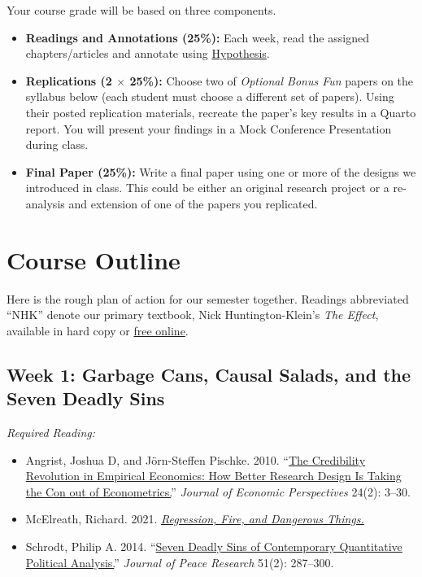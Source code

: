 \documentclass[11pt, letterpaper]{article}
\begin{document}
Your course grade will be based on three components.

\begin{itemize}
	\item \textbf{Readings and Annotations (25\%):} Each week, read the assigned chapters/articles and annotate using \href{https://hypothes.is/groups/Qm2VnAae/causal-inference}{Hypothesis}.
	\item \textbf{Replications (2 $\times$ 25\%):} Choose two of \textit{Optional Bonus Fun} papers on the syllabus below (each student must choose a different set of papers). Using their posted replication materials, recreate the paper's key results in a Quarto report. You will present your findings in a Mock Conference Presentation during class.
	\item \textbf{Final Paper (25\%):} Write a final paper using one or more of the designs we introduced in class. This could be either an original research project or a re-analysis and extension of one of the papers you replicated.
\end{itemize}


\section*{Course Outline}

Here is the rough plan of action for our semester together. Readings abbreviated ``NHK'' denote our primary textbook, Nick Huntington-Klein's \textit{The Effect}, available in hard copy or \href{https://theeffectbook.net/}{free online}.

\subsection*{Week 1: Garbage Cans, Causal Salads, and the Seven Deadly Sins}

\textit{Required Reading:}

\begin{itemize}
	\item Angrist, Joshua D, and Jörn-Steffen Pischke. 2010. ``\href{https://pubs.aeaweb.org/doi/pdfplus/10.1257/jep.24.2.3}{The Credibility Revolution in Empirical Economics: How Better Research Design Is Taking the Con out of Econometrics.}'' \textit{Journal of Economic Perspectives} 24(2): 3–30.
	\item McElreath, Richard. 2021. \href{https://elevanth.org/blog/2021/06/15/regression-fire-and-dangerous-things-1-3/}{\textit{Regression, Fire, and Dangerous Things.}}
	\item Schrodt, Philip A. 2014. ``\href{https://journals.sagepub.com/doi/pdf/10.1177/0022343313499597}{Seven Deadly Sins of Contemporary Quantitative Political Analysis.}'' \textit{Journal of Peace Research} 51(2): 287–300.
\end{itemize}
\end{document}
